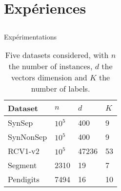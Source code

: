 \documentclass{beamer}
\begin{document}
\section{Expériences}
\subsection{}

\begin{frame}{Expérimentations}
	\begin{table}[h]
		\caption{Five datasets considered, with $n$ the number of instances, $d$ the vectors dimension and $K$ the number of labels.}
		\label{table:mce}
		\begin{center}
			\begin{tabular}{l l l l}
				{\bf Dataset}  & {\bf $n$} & {\bf $d$} & {\bf $K$}\\
				\hline
				SynSep & $10^5$ 	& 400 	& 9 \\
				
				SynNonSep & $10^5$ & 400 	& 9 \\
				
				RCV1-v2  & $10^5$ 	& 47236 	& 53 \\
				
				Segment & 2310	& 19	& 7	\\
				
				Pendigits 	& 7494	& 16	& 10	\\
			\end{tabular}
		\end{center}
	\end{table}
\end{frame}
\end{document}
